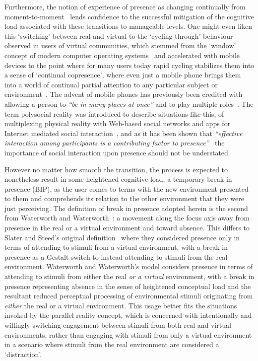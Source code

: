 Furthermore, the notion of experience of presence as changing continually from moment-to-moment~\cite{Heeter2003, Ijsselsteijn1998} lends confidence to the successful mitigation of the cognitive load associated with these transitions to manageable levels. One might even liken this `switching' between real and virtual to the `cycling through' behaviour observed in users of virtual communities, which stemmed from the `window' concept of modern computer operating systems~\cite{Turkle2004} and accelerated with mobile devices to the point where for many users today rapid cycling stabilizes them into a sense of `continual copresence', where even just a mobile phone brings them into a world of continual partial attention to any particular subject or environment~\cite{Turkle2011}. The advent of mobile phones has previously been credited with allowing a person to \textit{``be in many places at once''} and to play multiple roles~\cite{Terashima2001}. The term polysocial reality was introduced to describe situations like this, of multiplexing physical reality with Web-based social networks and apps for Internet mediated social interaction~\cite{Applin2012}, and as it has been shown that \textit{``effective interaction among participants is a contributing factor to presence''}~\cite{Terashima2001} the importance of social interaction upon presence should not be understated.


However no matter how smooth the transition, the process is expected to nonetheless result in some heightened cognitive load, a temporary break in presence (BIP), as the user comes to terms with the new environment presented to them and comprehends its relation to the other environment that they were just perceiving. The definition of break in presence adopted herein is the second from Waterworth and Waterworth~\cite{Waterworth2001}: a movement along the focus axis away from presence in the real or a virtual environment and toward absence. This differs to Slater and Steed's original definition~\cite{Slater2000} where they considered presence only in terms of attending to stimuli from a virtual environment, with a break in presence as a Gestalt switch to instead attending to stimuli from the real environment. Waterworth and Waterworth's model considers presence in terms of attending to stimuli from either the real \textit{or a virtual} environment, with a break in presence representing absence in the sense of heightened conceptual load and the resultant reduced perceptual processing of environmental stimuli originating from \textit{either} the real or a virtual environment. This usage better fits the situations invoked by the parallel reality concept, which is concerned with intentionally and willingly switching engagement between stimuli from both real and virtual environments, rather than engaging with stimuli from only a virtual environment in a scenario where stimuli from the real environment are considered a `distraction'.

